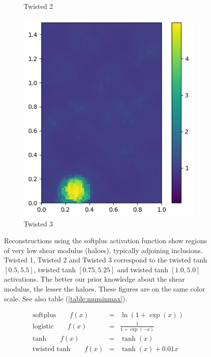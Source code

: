 \documentclass[12pt]{article}
\newcommand{\ber}{\begin{eqnarray}}
\newcommand{\eer}{\end{eqnarray}}
\newcommand{\nhghaloesheight}{3.2cm}
\newcommand{\nhghaloeswidth}{2.6cm}
\begin{document}
\begin{figure}[h]
\begin{subfigure}[c]{\nhghaloeswidth}
    \caption{\label{fig:haloes_tanhp25} Twisted 2}        
  \end{subfigure}
  \begin{subfigure}[c]{\nhghaloeswidth}    
    \includegraphics[totalheight=\nhghaloesheight]{Figures/softplus_halos/ex1/mutanhshift0.png}
    \caption{\label{fig:haloes_tanhp0} Twisted 3}    
  \end{subfigure}     
  \caption{\label{fig:haloes} Reconstructions using the softplus activation function show regions of very low shear modulus (haloes), typically adjoining inclusions. Twisted 1, Twisted 2 and Twisted 3 correspond to the twisted tanh $[0.5, 5.5]$, twisted tanh $[0.75,5.25]$ and twisted tanh $[1.0,5.0]$ activations. The better our prior knowledge about the shear modulus, the lesser the haloes. These figures are on the same color scale. See also table (\ref{table:muminmax}).}
\end{figure}
% 
\begin{subequations}
\ber
\text{softplus}\qquad f(x) &=& \ln(1+\exp(x)) \label{eqn:softplus}\\
\text{logistic}\qquad f(x) &=& \frac{1}{1+\exp(-x)}\label{eqn:logistic}\\
\text{tanh} \qquad f(x) &=& \tanh(x) \label{eqn:tanh}\\
\text{twisted tanh} \qquad f(x) &=& \tanh(x) + 0.01x  \label{eqn:twisttanh}
\eer
\label{eqn:activations}
\end{subequations}
\end{document}
